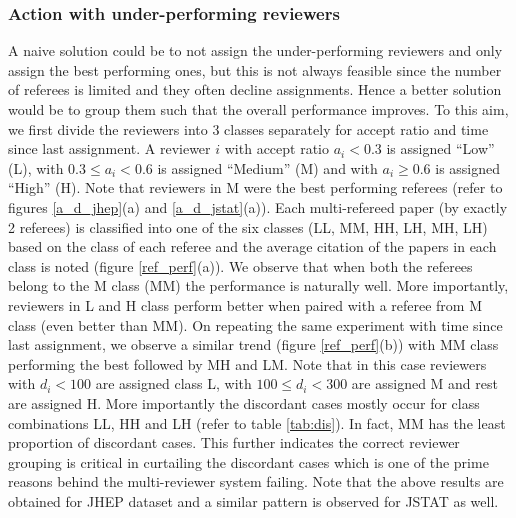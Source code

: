 \subsubsection{Action with under-performing reviewers}
A naive solution could be to not assign the under-performing reviewers and only assign the best performing ones, but this is not always feasible 
since the number of referees is limited and they often decline assignments. Hence a better solution would be to group them such that the overall performance improves. 
To this aim, we first divide the reviewers into 3 classes separately for accept ratio and time 
since last assignment. A reviewer $i$ with accept ratio $a_i < 0.3$ is assigned ``Low'' (L), with $0.3 \leq a_i < 0.6$ is assigned ``Medium'' (M) and with $a_i \geq 0.6$ is 
assigned ``High'' (H). Note that reviewers in M were the best performing referees (refer to figures \ref{a_d_jhep}(a) and \ref{a_d_jstat}(a)). Each multi-refereed paper 
(by exactly 2 referees) is classified into one of the six classes (LL, MM, HH, LH, MH, LH) based on the class of each referee and the average citation of the papers in each 
class is noted (figure \ref{ref_perf}(a)). We observe that when both the referees belong to the M class (MM) the performance is naturally well. More importantly, reviewers in L and H class 
perform better when paired with a referee from M class (even better than MM). On repeating the same experiment with time since last assignment, 
we observe a similar trend (figure \ref{ref_perf}(b)) with MM class performing the best followed by MH and LM.  
Note that in this case reviewers with $d_i < 100$ are assigned class L, with $100 \leq d_i < 300$ are assigned M and rest are assigned H. 
More importantly the discordant cases mostly occur for 
class combinations LL, HH and LH (refer to table \ref{tab:dis}). In fact, MM has the least proportion of discordant cases. 
This further indicates the correct reviewer grouping is critical in curtailing the discordant cases which is one of the prime reasons behind the multi-reviewer system failing. 
Note that the above results are obtained for JHEP dataset and a similar pattern is observed 
for JSTAT as well.


